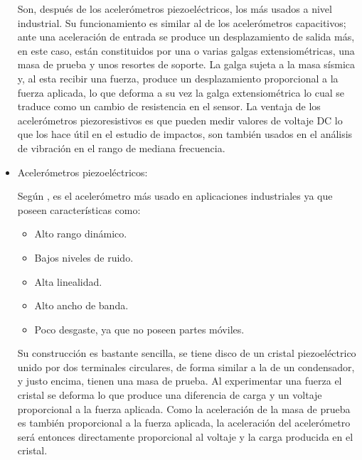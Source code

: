 \begin{itemize}
        Son, después de los acelerómetros piezoeléctricos, los más usados a nivel
        industrial. Su funcionamiento es similar al de los acelerómetros
        capacitivos; ante una aceleración de entrada se produce un desplazamiento
        de salida más, en este caso, están constituidos por una o varias
        galgas extensiométricas, una masa de prueba y unos resortes de soporte.
        La galga sujeta a la masa sísmica y, al esta recibir una fuerza, produce
        un desplazamiento proporcional a la fuerza aplicada, lo que deforma a
        su vez la galga extensiométrica lo cual se traduce como un
        cambio de resistencia en el sensor. La ventaja de los acelerómetros
        piezoresistivos es que pueden medir valores de voltaje DC lo que los
        hace útil en el estudio de impactos, son también usados en el
        análisis de vibración en el rango de mediana frecuencia.

\newpage
    \item Acelerómetros piezoeléctricos:

        Según \textcite{WeberPiezoelectricAT}, es el acelerómetro más usado en
        aplicaciones industriales ya que
        poseen características como:

        \begin{itemize}[noitemsep]
            \item Alto rango dinámico.
            \item Bajos niveles de ruido.
            \item Alta linealidad.
            \item Alto ancho de banda.
            \item Poco desgaste, ya que no poseen partes móviles.
        \end{itemize}


        Su construcción es bastante sencilla, se tiene disco de un cristal
        piezoeléctrico unido por dos terminales circulares, de forma similar a
        la de un condensador, y justo encima, tienen una masa de prueba.
        Al experimentar una fuerza el cristal se deforma lo que produce una
        diferencia de carga y un voltaje proporcional a la fuerza aplicada.
        Como la aceleración de la masa de prueba es también proporcional a la
        fuerza aplicada, la aceleración del acelerómetro será entonces
        directamente proporcional al voltaje y la carga producida en el cristal.

\end{itemize}


